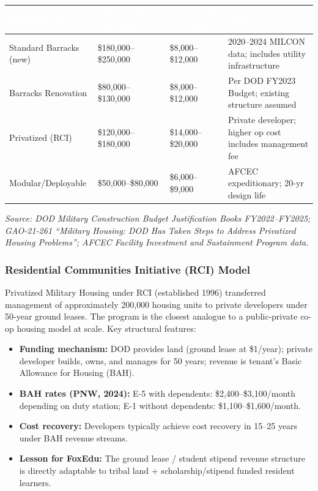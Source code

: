 \documentclass[11pt,letterpaper]{article}
\newcommand{\tableheader}[1]{\textbf{\sffamily\textcolor{white}{#1}}}
\begin{document}
\begin{center}
\begin{tabularx}{\textwidth}{L{3cm}C{2.5cm}C{2.5cm}X}
\toprule
{}
\tableheader{Facility Type} & \tableheader{Construction Cost/Bed} & \tableheader{Annual Op Cost/Bed} & \tableheader{Notes} \\
\midrule
Standard Barracks (new) & \$180,000--\$250,000 & \$8,000--\$12,000 & 2020--2024 MILCON data; includes utility infrastructure \\
Barracks Renovation & \$80,000--\$130,000 & \$8,000--\$12,000 & Per DOD FY2023 Budget; existing structure assumed \\
Privatized (RCI) & \$120,000--\$180,000 & \$14,000--\$20,000 & Private developer; higher op cost includes management fee \\
Modular/Deployable & \$50,000--\$80,000 & \$6,000--\$9,000 & AFCEC expeditionary; 20-yr design life \\
\bottomrule
\end{tabularx}
\end{center}

\textit{Source: DOD Military Construction Budget Justification Books FY2022--FY2025; GAO-21-261 ``Military Housing: DOD Has Taken Steps to Address Privatized Housing Problems''; AFCEC Facility Investment and Sustainment Program data.}

\subsubsection{Residential Communities Initiative (RCI) Model}

Privatized Military Housing under RCI (established 1996) transferred management of approximately 200{,}000 housing units to private developers under 50-year ground leases. The program is the closest analogue to a public-private co-op housing model at scale. Key structural features:

\begin{itemize}[leftmargin=1.5em]
  \item \textbf{Funding mechanism:} DOD provides land (ground lease at \$1/year); private developer builds, owns, and manages for 50 years; revenue is tenant's Basic Allowance for Housing (BAH).
  \item \textbf{BAH rates (PNW, 2024):} E-5 with dependents: \$2,400--\$3,100/month depending on duty station; E-1 without dependents: \$1,100--\$1,600/month.
  \item \textbf{Cost recovery:} Developers typically achieve cost recovery in 15--25 years under BAH revenue streams.
  \item \textbf{Lesson for FoxEdu:} The ground lease / student stipend revenue structure is directly adaptable to tribal land + scholarship/stipend funded resident learners.
\end{itemize}
\end{document}
